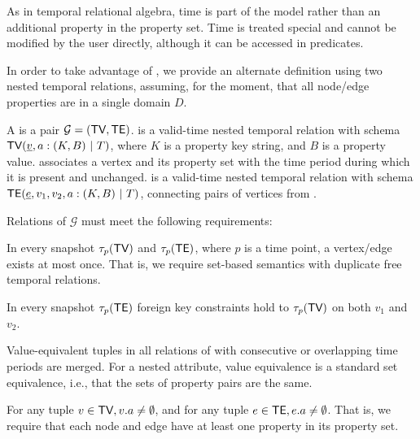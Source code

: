 As in temporal relational algebra, time is part of the model rather
than an additional property in the property set.  Time is treated
special and cannot be modified by the user directly, although it can
be accessed in predicates.  

In order to take advantage of \tra, we provide an alternate definition
using two nested temporal relations, assuming, for the
  moment, that all node/edge properties are in a single domain $D$.

\begin{definition}
\label{def:tg2}
A \tg is a pair $\mathcal{G}=(\textsf{TV}, \textsf{TE})$. \tv is a valid-time nested
temporal relation with schema $\textsf{TV}(\underline{v}, a: (K,B) ~|~T)$,
where $K$ is a property key string, and $B$ is a property value.
  \tv
associates a vertex and its property set with the time period during
which it is present and unchanged. \te is a valid-time nested temporal
relation with schema $\textsf{TE}(\underline{e}, v_1, v_2, a:
(K,B) ~|~T)$, connecting pairs of vertices from \tv.

Relations of $\mathcal{G}$ must meet the following requirements:

\begin{description}[noitemsep,itemindent=\dimexpr\labelwidth+\labelsep\relax,leftmargin=0pt]
\item [R1: Unique vertices/ edges] In every snapshot $\tau_p (\textsf{TV})$
  and $\tau_p (\textsf{TE})$, where $p$ is a time point, a vertex/edge
  exists at most once.  That is, we require set-based semantics with
  duplicate free temporal relations.
\item [R2: Referential integrity] In every snapshot $\tau_p(\textsf{TE})$
  foreign key constraints hold to $\tau_p (\textsf{TV})$ on both $v_1$ and
  $v_2$.
\item [R3: Coalesced] Value-equivalent tuples in all relations of \tve
  with consecutive or overlapping time periods are merged.  For a
  nested attribute, value equivalence is a standard set equivalence,
  i.e., that the sets of property pairs are the same.
\item [R4: Required property] For any tuple $\medmuskip=0mu v \in \tv, v.a \neq
  \emptyset$, and for any tuple $e \in \textsf{TE}, e.a \neq \emptyset$.  That
  is, we require that each node and edge have at least one property in
  its property set.
\end{description}
\end{definition}

